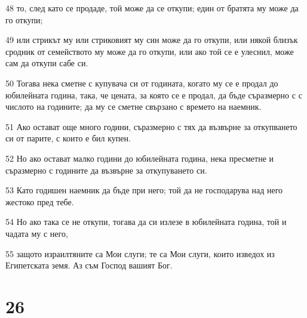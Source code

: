 \par 48 то, след като се продаде, той може да се откупи; един от братята му може да го откупи;
\par 49 или стрикът му или стриковият му син може да го откупи, или някой близък сродник от семейството му може да го откупи, или ако той се е улеснил, може сам да откупи сабе си.
\par 50 Тогава нека сметне с купувача си от годината, когато му се е продал до юбилейната година, така, че цената, за която се е продал, да бъде съразмерно с с числото на годините; да му се сметне свързано с времето на наемник.
\par 51 Ако остават още много години, съразмерно с тях да възвърне за откупването си от парите, с които е бил купен.
\par 52 Но ако остават малко години до юбилейната година, нека пресметне и съразмерно с годините да възвърне за откупуването си.
\par 53 Като годишен наемник да бъде при него; той да не господарува над него жестоко пред тебе.
\par 54 Но ако така се не откупи, тогава да си излезе в юбилейната година, той и чадата му с него,
\par 55 защото израилтяните са Мои слуги; те са Мои слуги, които изведох из Египетската земя. Аз съм Господ вашият Бог.

\chapter{26}

